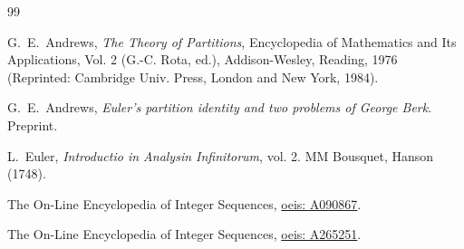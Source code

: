 \documentclass[12pt]{amsart}
\numberwithin{equation}{section}
\theoremstyle{plain}
\theoremstyle{definition}
\begin{document}
\begin{thebibliography}{99}

G.~E.~Andrews, \emph{The Theory of Partitions}, Encyclopedia of Mathematics and Its Applications, Vol. 2 (G.-C. Rota, ed.), Addison-Wesley, Reading, 1976 (Reprinted: Cambridge Univ. Press, London and New York, 1984).

G.~E.~Andrews, \emph{Euler's partition identity and two problems of George Berk}. Preprint.

L.~Euler, \emph{Introductio in Analysin Infinitorum}, vol. 2. MM Bousquet, Hanson (1748).

The On-Line Encyclopedia of Integer Sequences, \href{http://oeis.org/A090867}{oeis: A090867}.

The On-Line Encyclopedia of Integer Sequences, \href{http://oeis.org/A265251}{oeis: A265251}.


\end{thebibliography}
\end{document}
